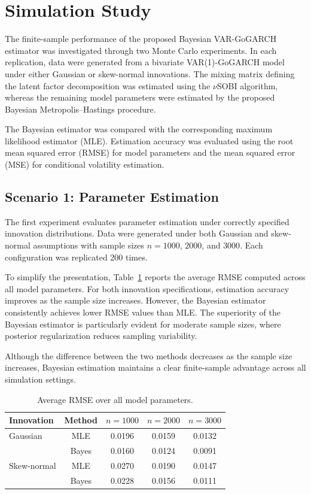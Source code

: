 \documentclass[twoside]{article}
\begin{document}
\section{Simulation Study}

The finite-sample performance of the proposed Bayesian VAR-GoGARCH estimator was investigated through two Monte Carlo experiments. In each replication, data were generated from a bivariate VAR(1)-GoGARCH model under either Gaussian or skew-normal innovations. The mixing matrix defining the latent factor decomposition was estimated using the $\nu$SOBI algorithm, whereas the remaining model parameters were estimated by the proposed Bayesian Metropolis--Hastings procedure.

The Bayesian estimator was compared with the corresponding maximum likelihood estimator (MLE). Estimation accuracy was evaluated using the root mean squared error (RMSE) for model parameters and the mean squared error (MSE) for conditional volatility estimation. 


\subsection{Scenario 1: Parameter Estimation}

The first experiment evaluates parameter estimation under correctly specified innovation distributions. Data were generated under both Gaussian and skew-normal assumptions with sample sizes $n=1000$, $2000$, and $3000$. Each configuration was replicated 200 times.

To simplify the presentation, Table~\ref{tab:RMSEsummary} reports the average RMSE computed across all model parameters. For both innovation specifications, estimation accuracy improves as the sample size increases. However, the Bayesian estimator consistently achieves lower RMSE values than MLE. The superiority of the Bayesian estimator is particularly evident for moderate sample sizes, where posterior regularization reduces sampling variability.

Although the difference between the two methods decreases as the sample size increases, Bayesian estimation maintains a clear finite-sample advantage across all simulation settings.
\begin{table}[ht]
\centering
\scriptsize
\caption{Average RMSE over all model parameters.}
\label{tab:RMSEsummary}
\begin{tabular}{lcccc}
\hline
Innovation & Method & $n=1000$ & $n=2000$ & $n=3000$\\
\hline
Gaussian
& MLE   & 0.0196 & 0.0159 & 0.0132\\
& Bayes & 0.0160 & 0.0124 & 0.0091\\
\hline
Skew-normal
& MLE   & 0.0270 & 0.0190 & 0.0147\\
& Bayes & 0.0228 & 0.0156 & 0.0111\\
\hline
\end{tabular}
\end{table}
\end{document}
